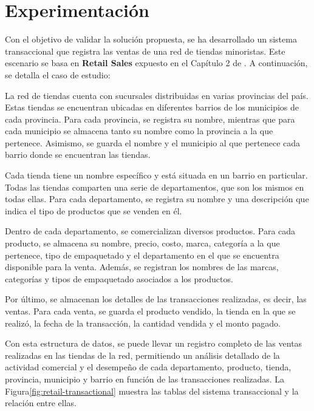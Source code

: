 \section{Experimentaci\'on} \label{section:Experimentation}

Con el objetivo de validar la solución propuesta, se ha desarrollado un sistema transaccional que registra las 
ventas de una red de tiendas minoristas. Este escenario se basa en \textbf{Retail Sales} expuesto en el Cap\'itulo 2
de \cite{kimball2011data}. A continuación, se detalla el caso de estudio:

La red de tiendas cuenta con sucursales distribuidas en varias provincias del país. Estas tiendas se encuentran ubicadas 
en diferentes barrios de los municipios de cada provincia. Para cada provincia, se registra su nombre, mientras que para 
cada municipio se almacena tanto su nombre como la provincia a la que pertenece. Asimismo, se guarda el nombre y el 
municipio al que pertenece cada barrio donde se encuentran las tiendas.

Cada tienda tiene un nombre específico y está situada en un barrio en particular. Todas las tiendas comparten una serie 
de departamentos, que son los mismos en todas ellas. Para cada departamento, se registra su nombre y una descripción que 
indica el tipo de productos que se venden en él.

Dentro de cada departamento, se comercializan diversos productos. Para cada producto, se almacena su nombre, precio, costo, 
marca, categoría a la que pertenece, tipo de empaquetado y el departamento en el que se encuentra disponible para la venta. 
Además, se registran los nombres de las marcas, categorías y tipos de empaquetado asociados a los productos.

Por último, se almacenan los detalles de las transacciones realizadas, es decir, las ventas. Para cada venta, se guarda 
el producto vendido, la tienda en la que se realizó, la fecha de la transacción, la cantidad vendida y el monto pagado.

Con esta estructura de datos, se puede llevar un registro completo de las ventas realizadas en las tiendas de la red, 
permitiendo un análisis detallado de la actividad comercial y el desempeño de cada departamento, producto, tienda, 
provincia, municipio y barrio en función de las transacciones realizadas. La Figura\ref{fig:retail-transactional}
muestra las tablas del sistema transaccional y la relación entre ellas.

